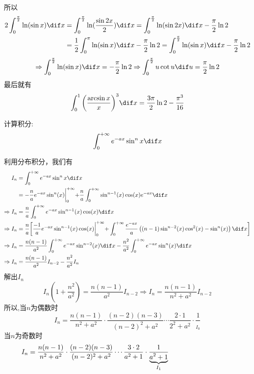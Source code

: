 \documentclass[color=green,titlestyle=hang]{elegantbook}%
\begin{document}
\begin{solution}
所以\begin{align*}
2\int_0^{\frac{\pi }{2}} {\ln (\sin x)\dif x}  &= \int_0^{\frac{\pi }{2}} {\ln (\frac{{\sin 2x}}{2})\dif x}  = \int_0^{\frac{\pi }{2}} {\ln (\sin 2x)\dif x}  - \frac{\pi }{2}\ln 2\\
&= \frac{1}{2}\int_0^\pi  {\ln (\sin x)\dif x}  - \frac{\pi }{2}\ln 2 = \int_0^{\frac{\pi }{2}} {\ln (\sin x)\dif x}  - \frac{\pi }{2}\ln 2
\end{align*}
\[ \Rightarrow \int_0^{\frac{\pi }{2}} {\ln (\sin x)\dif x}  =  - \frac{\pi }{2}\ln 2 \Rightarrow \int_0^{\frac{\pi }{2}} {u\cot u\dif u}  = \frac{\pi }{2}\ln 2\]
最后就有\[\int_0^1 {{{\left( {\frac{{\arcsin x}}{x}} \right)}^3}\dif x}  = \frac{{3\pi }}{2}\ln 2 - \frac{{{\pi ^3}}}{{16}}\]	
\end{solution}

\begin{exercise}计算积分:$$\int_{0}^{+\infty}e^{-ax}\sin^nx\dif x$$\end{exercise}\begin{solution}利用分布积分，我们有
\begin{align*}I_n&=\int_{0}^{+\infty}e^{-ax}\sin^nx\dif x\hspace{4cm}\\
&=-\frac{n}{a}e^{-ax}\sin^n(x)\biggl|_{0}^{+\infty}+\frac{n}{a}\int_{0}^{+\infty}\sin^{n-1}(x)\cos (x)e^{-ax}\dif x\\
\Rightarrow I_n&=\frac{n}{a}\int_{0}^{+\infty}e^{-ax}\sin^{n-1}(x)\cos (x)\dif x\\
\Rightarrow I_n&=\frac{n}{a}\biggl[\frac{-1}{a}e^{-ax}\sin^{n-1}(x)\cos(x)\biggl|_{0}^{+\infty}+\int_{0}^{+\infty}\frac{e^{-ax}}{a}\left((n-1)\sin^{n-2}(x)\cos^2(x)-\sin^n(x)\right)\dif x\biggl]\\
\Rightarrow I_n&=\frac{n(n-1)}{a^2}\int_{0}^{+\infty}e^{-ax}\sin^{n-2}(x)\dif x-\frac{n^2}{a^2}\int_{0}^{+\infty}e^{-ax}\sin^{n}(x)\dif x\\
\Rightarrow I_n&=\frac{n(n-1)}{a^2}I_{n-2}-\frac{n^2}{a^2}I_n
\end{align*}
解出$I_n$$$I_n\left(1+\frac{n^2}{a^2}\right)=\frac{n(n-1)}{a^2}I_{n-2}\Rightarrow I_n=\frac{n(n-1)}{n^2+a^2}I_{n-2}$$
所以,当$n$为偶数时
$$I_n=\frac{n(n-1)}{n^2+a^2}\cdot\frac{(n-2)(n-3)}{(n-2)^2+a^2}\cdots\frac{2\cdot1}{2^2+a^2}\cdot\frac{1}{\displaystyle\mathop{{\underbrace{a}}}_{I_0}}$$
当$n$为奇数时$$I_n=\frac{n(n-1)}{n^2+a^2}\cdot\frac{(n-2)(n-3)}{(n-2)^2+a^2}\cdots\frac{3\cdot2}{a^2+1}\cdot\frac{1}{\displaystyle\mathop{{\underbrace{a^2+1}}}_{I_1}}\hspace{3.3cm}$$

\end{solution}
\end{document}
